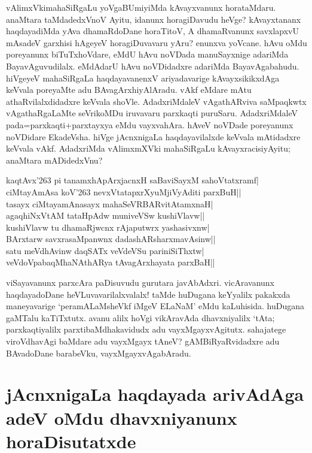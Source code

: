 vAlimxVkimahaSiRgaLu yoVgaBUmiyiMda kAvayxvanunx horataMdaru. anaMtara taMdadedxVnoV Ayitu, idanunx horagiDavudu heVge? kAvayxtananx haqdayadiMda yAva dhamaRdoDane horaTitoV, A dhamaRvanunx savxlapxvU mAsadeV garxhisi hAgeyeV horagiDuvavaru yAru? enunxva yoVcane. hAvu oMdu poreyanunx biTuTxhoVdare, eMdU hAvu noVDada manuSayxnige adariMda BayavAguvudilalx. eMdAdarU hAvu noVDidadxre adariMda BayavAgabahudu. hiVgeyeV mahaSiRgaLa haqdayavanenxV ariyadavarige kAvayxsikikxdAga keVvala poreyaMte adu BAvagArxhiyAlAradu. vAkf eMdare mAtu athaRvilalxdidadxre keVvala shoVle. AdadxriMdaleV vAgathARviva saMpaqkwtx vAgathaRgaLaMte\label{238} seVrikoMDu iruvavaru parxkaqti puruSaru. AdadxriMdaleV pada=parxkaqti+parxtayxya eMdu vayxvahAra. hAveV noVDade poreyanunx noVDidare EkadeVsha. hiVge jAcnxnigaLa haqdayavilalxde keVvala mAtidadxre keVvala vAkf. AdadxriMda vAlimxmXVki mahaSiRgaLu kAvayxracisiyAyitu; anaMtara mADidedxVnu? 

\begin{shloka}
kaqtAvx\char'263 pi tanamxhApArxjacnxH saBaviSayxM sahoVtatxramf|\label{238a}\\
ciMtayAmAsa koV\char'263 nevxVtatapxrXyuMjiVyAditi parxBuH||\\
tasayx ciMtayamAnasayx mahaSeVRBARvitAtamxnaH|\label{238c}\\
agaqhiNxVtAM tataHpAdw muniveVSw kushiVlavw||\\
kushiVlavw tu dhamaRjwcnx rAjaputwrx yashasivxnw|\label{238b}\\
BArxtarw savxrasaMpanwnx dadashARsharxmavAsinw||\\
satu meVdhAvinw daqSATx veVdeVSu pariniSiThxtw|\label{239}\\
veVdoVpabaqMhaNAthARya tAvagArxhayata parxBaH||
\end{shloka}

viSayavanunx parxcAra paDisuvudu gurutara javAbAdxri. vicAravanunx haqdayadoDane heVLuvavarilalxvalalx! taMde huDugana keYyalilx pakakxda maneyavarige `peramALaMsheVkf iMgeV ELaNaM' eMdu kaLuhisida. huDugana gaMTalu kaTiTxtutx. avanu alilx hoVgi vikAravAda dhavxniyalilx `tAta; parxkaqtiyalilx parxtibaMdhakavidudx adu vayxMgayxvAgitutx. sahajatege viroVdhavAgi baMdare adu vayxMgayx tAneV? gAMBiRyaRvidadxre adu BAvadoDane barabeVku, vayxMgayxvAgabAradu.

\section*{jAcnxnigaLa haqdayada arivAdAga adeV oMdu dhavxniyanunx  horaDisutatxde}


